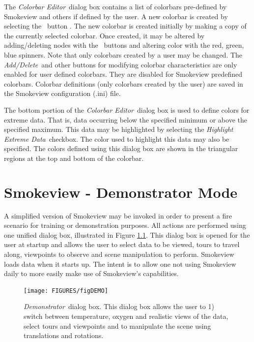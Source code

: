 \documentclass[11pt,twoside]{book}
\newcommand{\frameit}[1]{\fbox{\tt #1}}
\begin{document}
The {\em Colorbar Editor}\ dialog box contains a list of colorbars
pre-defined by Smokeview and others if defined by the user. A new
colorbar is created by selecting the \frameit{New}\ button . The
new colorbar is created initially by making a copy of the
currently selected colorbar. Once created, it may be altered by
adding/deleting nodes with the \frameit{Add/Delete}\ buttons and
altering color with the red, green, blue spinners. Note that only
colorbars created by a user may be changed. The {\em Add/Delete}\
and other buttons for modifying colorbar characteristics are only
enabled for user defined colorbars.  They are disabled for
Smokeview predefined colorbars. Colorbar definitions (only
colorbars created by the user) are saved in the Smokeview
configuration (.ini) file.

The bottom portion of the {\em Colorbar Editor}\ dialog box is
used to define colors for extreme data.  That is, data occurring
below the specified minimum or above the specified maximum.  This
data may be highlighted by selecting the {\em Highlight Extreme
Data}\ checkbox. The color used to highlight this data may also be
specified.  The colors defined using this dialog box are shown in
the triangular regions at the top and bottom of the colorbar.

\chapter{Smokeview - Demonstrator Mode}
A simplified version of Smokeview may be invoked in order to present a fire
scenario for training or demonstration
purposes.  All actions are performed using one unified dialog box,
illustrated in Figure \ref{figDEMO}.  This dialog box is opened for the
user at startup and allows the user to select data to be viewed, tours to
travel along, viewpoints to observe and scene manipulation to perform.
Smokeview loads data when it starts up.
The intent is to allow one not using Smokeview daily to more easily
make use of Smokeview's capabilities.


\begin{figure}[\figoptions]
\begin{center}
\texttt{[image: FIGURES/figDEMO]}
\end{center}
\caption[{\em Demonstrator}\ dialog box.]{{\em Demonstrator}\ dialog box.
This dialog box allows the user to 1) switch between temperature, oxygen and realistic views of the data,
select tours and viewpoints
 and to manipulate the scene using translations and rotations.} \label{figDEMO}
\end{figure}
\end{document}
